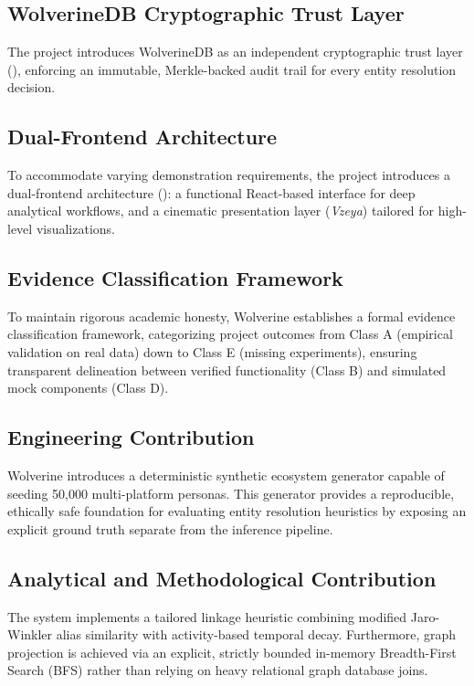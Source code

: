 \subsection{WolverineDB Cryptographic Trust Layer}
The project introduces WolverineDB as an independent cryptographic trust layer (), enforcing an immutable, Merkle-backed audit trail for every entity resolution decision.

\subsection{Dual-Frontend Architecture}
To accommodate varying demonstration requirements, the project introduces a dual-frontend architecture (): a functional React-based interface for deep analytical workflows, and a cinematic presentation layer (\textit{Vzeya}) tailored for high-level visualizations.

\subsection{Evidence Classification Framework}
To maintain rigorous academic honesty, Wolverine establishes a formal evidence classification framework, categorizing project outcomes from Class A (empirical validation on real data) down to Class E (missing experiments), ensuring transparent delineation between verified functionality (Class B) and simulated mock components (Class D).

\subsection{Engineering Contribution}
Wolverine introduces a deterministic synthetic ecosystem generator capable of seeding 50,000 multi-platform personas. This generator provides a reproducible, ethically safe foundation for evaluating entity resolution heuristics by exposing an explicit ground truth separate from the inference pipeline.

\subsection{Analytical and Methodological Contribution}
The system implements a tailored linkage heuristic combining modified Jaro-Winkler alias similarity with activity-based temporal decay. Furthermore, graph projection is achieved via an explicit, strictly bounded in-memory Breadth-First Search (BFS) rather than relying on heavy relational graph database joins.

